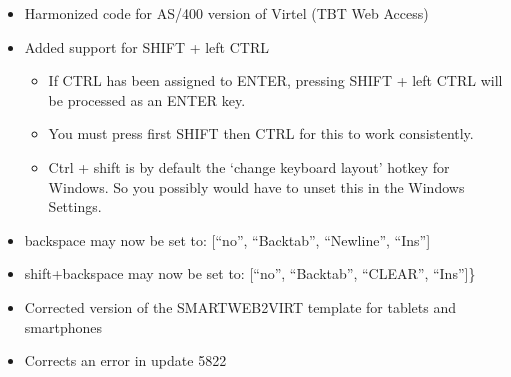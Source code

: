 \documentclass[letterpaper,10pt,english]{sphinxmanual}
\begin{document}
\begin{itemize}
\item {} 
Harmonized code for AS/400 version of Virtel (TBT Web Access)

\end{itemize}

\begin{itemize}
\item {} 
Added support for SHIFT + left CTRL
\begin{itemize}
\item {} 
If CTRL has been assigned to ENTER, pressing SHIFT + left CTRL will be processed as an ENTER key.

\item {} 
You must press first SHIFT then CTRL for this to work consistently.

\item {} 
Ctrl + shift is by default the ‘change keyboard layout’ hotkey for Windows. So you possibly would have to unset this in the Windows Settings.

\end{itemize}

\end{itemize}

\begin{itemize}
\item {} 
backspace may now be set to:          {[}“no”, “Backtab”, “Newline”, “Ins”{]}

\item {} 
shift+backspace may now be set to:    {[}“no”, “Backtab”, “CLEAR”, “Ins”{]}\}

\end{itemize}

\begin{itemize}
\item {} 
Corrected version of the SMARTWEB2VIRT template for tablets and smartphones

\end{itemize}

\begin{itemize}
\item {} 
Corrects an error in update 5822

\end{itemize}
\end{document}
